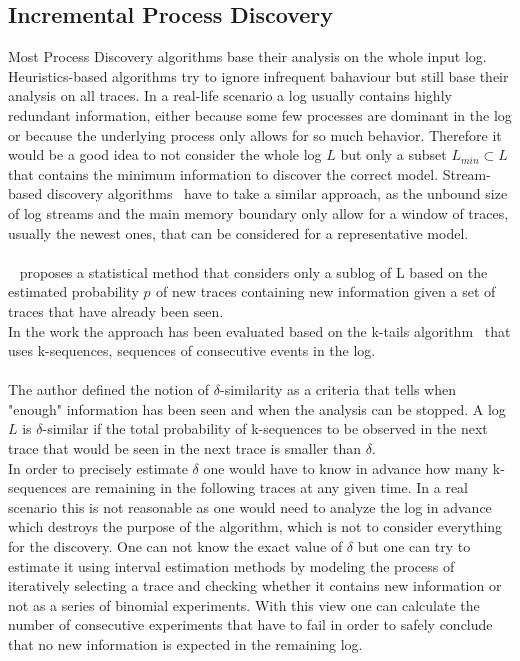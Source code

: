 \documentclass[
	a4paper,
	pagesize,
	pdftex,
	12pt,
	twoside, %
	BCOR=5mm, %
	ngerman,
	fleqn,
	final,
	]{scrartcl}
\begin{document}
\subsection{Incremental Process Discovery}
Most Process Discovery algorithms base their analysis on the whole input log. Heuristics-based algorithms try to ignore infrequent bahaviour but still base their analysis on all traces. In a real-life scenario a log usually contains highly redundant information, either because some few processes are dominant in the log or because the underlying process only allows for so much behavior. Therefore it would be a good idea to not consider the whole log $L$ but only a subset $L_{min}\subset L$ that contains the minimum information to discover the correct model. Stream-based discovery algorithms~\cite{Streams} have to take a similar approach, as the unbound size of log streams and the main memory boundary only allow for a window of traces, usually the newest ones, that can be considered for a representative model.\\\\
~\cite{PartialLogAnalysis} proposes a statistical method that considers only a sublog of L based on the estimated probability $p^{}$ of new traces containing new information given a set of traces that have already been seen.\\
In the work the approach has been evaluated based on the k-tails algorithm~\cite{KTails} that uses k-sequences, sequences of consecutive events in the log.\\\\
The author defined the notion of $\delta$-similarity as a criteria that tells when "enough" information has been seen and when the analysis can be stopped. A log $L$ is $\delta$-similar if the total probability of k-sequences to be observed in the next trace that would be seen in the next trace is smaller than $\delta$.\\ In order to precisely estimate $\delta$ one would have to know in advance how many k-sequences are remaining in the following traces at any given time. In a real scenario this is not reasonable as one would need to analyze the log in advance which destroys the purpose of the algorithm, which is not to consider everything for the discovery. One can not know the exact value of $\delta$ but one can try to estimate it using interval estimation methods by modeling the process of iteratively selecting a trace and checking whether it contains new information or not as a series of binomial experiments. With this view one can calculate the number of consecutive experiments that have to fail in order to safely conclude that no new information is expected in the remaining log.\\\\
\end{document}
